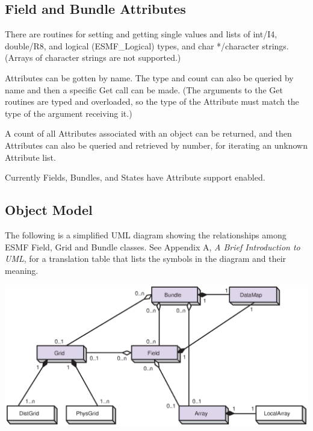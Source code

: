 \subsection{Field and Bundle Attributes}

There are routines for setting and getting single values and lists of
int/I4, double/R8, and logical (ESMF\_Logical) types, and char */character
strings.  (Arrays of character strings are not supported.)

Attributes can be gotten by name.  The type and count can also be queried
by name and then a specific Get call can be made.  (The arguments to the
Get routines are typed and overloaded, so the type of the Attribute must
match the type of the argument receiving it.)

A count of all Attributes associated with an object can be returned, and
then Attributes can also be queried and retrieved by number, for iterating
an unknown Attribute list.

Currently Fields, Bundles, and States have Attribute support enabled.



\newpage
\subsection{Object Model}

The following is a simplified UML diagram showing the relationships among
ESMF Field, Grid and Bundle classes.  See Appendix A, {\it A Brief 
Introduction to UML},
for a translation table that lists the symbols in the diagram and their 
meaning.

\begin{center}
\includegraphics{Bundle_obj.eps}   
\end{center}

